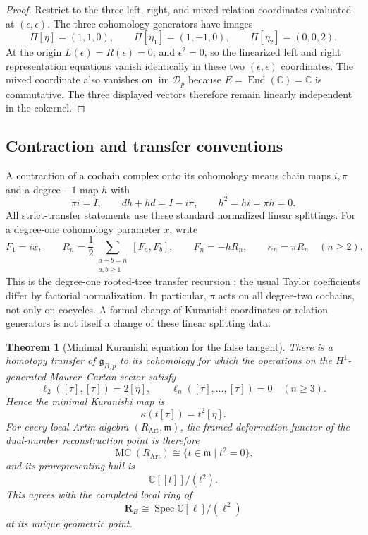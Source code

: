 \documentclass[11pt]{amsart}
\newtheorem{theorem}{Theorem}[section]
\newcommand{\End}{\operatorname{End}}
\newcommand{\Spec}{\operatorname{Spec}}
\newcommand{\cD}{\mathscr D}
\newcommand{\C}{\mathbb C}
\newcommand{\MC}{\operatorname{MC}}
\newcommand{\ghoch}{\mathfrak g}
\begin{document}
\begin{proof}
Restrict to the three left, right, and mixed relation coordinates evaluated at $(\epsilon,\epsilon)$.  The three cohomology generators have images
\[
\overline\Pi[\eta]=(1,1,0),
\qquad
\overline\Pi[\eta_1]=(1,-1,0),
\qquad
\overline\Pi[\eta_2]=(0,0,2).
\]
At the origin $L(\epsilon)=R(\epsilon)=0$, and $\epsilon^2=0$, so the linearized left and right representation equations vanish identically in these two $(\epsilon,\epsilon)$ coordinates.  The mixed coordinate also vanishes on $\operatorname{im}\cD_p$ because $E=\End(\C)=\C$ is commutative.  The three displayed vectors therefore remain linearly independent in the cokernel.
\end{proof}

\subsection{Contraction and transfer conventions}\label{subsec:transfer-convention}
A contraction of a cochain complex onto its cohomology means chain maps
$i,\pi$ and a degree $-1$ map $h$ with
\[
\pi i=I,\qquad dh+hd=I-i\pi,\qquad h^2=hi=\pi h=0.
\]
All strict-transfer statements use these standard normalized linear
splittings. For a degree-one cohomology parameter $x$, write
\[
F_1=ix,\qquad
R_n=\frac12\sum_{\substack{a+b=n\\a,b\ge1}}[F_a,F_b],
\qquad F_n=-hR_n,\qquad \kappa_n=\pi R_n\quad(n\ge2).
\]
This is the degree-one rooted-tree transfer recursion
\cite[Chapter~10]{LodayVallette2012}; the usual Taylor coefficients differ
by factorial normalization. In particular, $\pi$ acts on all degree-two
cochains, not only on cocycles. A formal change of Kuranishi coordinates
or relation generators is not itself a change of these linear splitting data.

\begin{theorem}[Minimal Kuranishi equation for the false tangent]\label{thm:dual-minimal-kuranishi}
There is a homotopy transfer of $\ghoch_{B,p}$ to its cohomology for which the operations on the $H^1$-generated Maurer--Cartan sector satisfy
\[
\ell_2([\tau],[\tau])=2[\eta],
\qquad
\ell_n([\tau],\ldots,[\tau])=0
\quad(n\ge3).
\]
Hence the minimal Kuranishi map is
\[
\kappa(t[\tau])=t^2[\eta].
\]
For every local Artin algebra $(R_{\mathrm{Art}},\mathfrak m)$, the framed deformation functor of the dual-number reconstruction point is therefore
\[
\MC(R_{\mathrm{Art}})
\cong
\{t\in\mathfrak m\mid t^2=0\},
\]
and its prorepresenting hull is
\[
\boxed{
\C[[t]]/(t^2).
}
\]
This agrees with the completed local ring of
\[
\mathbf R_B\cong\Spec\C[\ell]/(\ell^2)
\]
at its unique geometric point.
\end{theorem}
\end{document}
